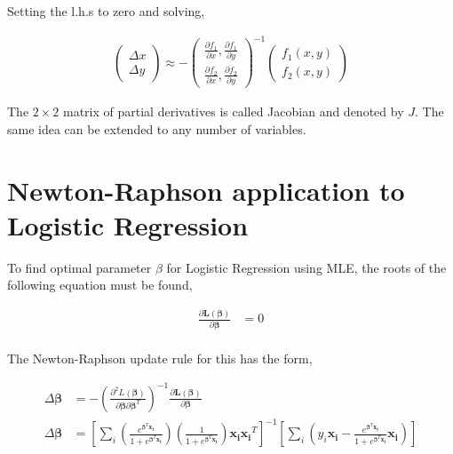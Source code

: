 \documentclass[11pt, a4paper]{article}
\begin{document}
Setting the l.h.s to zero and solving,

\begin{align*}
	\begin{pmatrix} \Delta x \\ \Delta y \end{pmatrix}  \approx -\begin{pmatrix} \frac{\partial f_1}{\partial x}, \frac{\partial f_1}{\partial y} \\ \frac{\partial f_2}{\partial x}, \frac{\partial f_2}{\partial y}\end{pmatrix}^{-1} \begin{pmatrix} f_1(x, y) \\ f_2(x, y) \end{pmatrix}
\end{align*}

The $2\times2$ matrix of partial derivatives is called Jacobian and denoted by $J$. The same idea can be extended to any number of variables.

\section{Newton-Raphson application to Logistic Regression}

To find optimal parameter $\beta$ for Logistic Regression using MLE, the roots of the following equation must be found,

\begin{align*}
	\frac{\partial \boldsymbol{L}(\boldsymbol{\beta})} {\partial \boldsymbol{\beta}} & = 0 \\
\end{align*}

The Newton-Raphson update rule for this has the form,

\begin{align*}
	\Delta \boldsymbol{\beta} & = -\left(\frac{\partial^2 L(\boldsymbol{\beta})}{\partial \boldsymbol{\beta} \partial \boldsymbol{\beta}^T}\right)^{-1} \frac{\partial \boldsymbol{L}(\boldsymbol{\beta})} {\partial \boldsymbol{\beta}}                                                                                                                                                                                                                \\
	\Delta \boldsymbol{\beta} & = \left[ \sum_i \left(\frac{e^{\boldsymbol{\beta}^T\boldsymbol{x_i}}}{1 + e^{\boldsymbol{\beta}^T\boldsymbol{x_i}}}\right) \left(\frac{1}{1 + e^{\boldsymbol{\beta}^T\boldsymbol{x_i}}}\right) \boldsymbol{x_i} \boldsymbol{x_i}^T \right]^{-1} \left[ \sum_i \left(y_i \boldsymbol{x_i} - \frac{e^{\boldsymbol{\beta}^T\boldsymbol{x_i}}}{1 + e^{\boldsymbol{\beta}^T\boldsymbol{x_i}}} \boldsymbol{x_i}\right)\right] 
\end{align*} 
\end{document}
